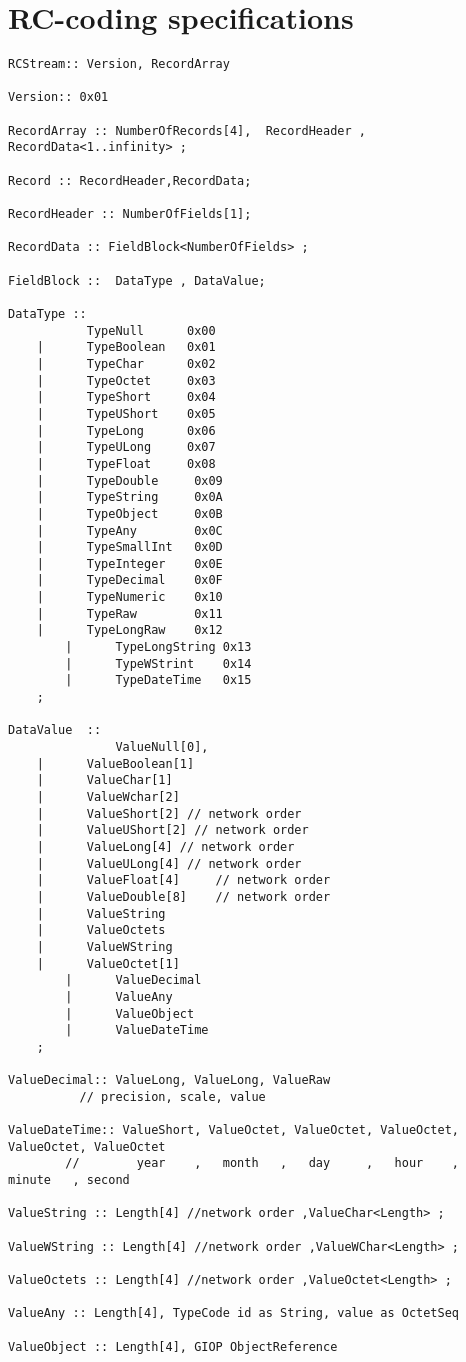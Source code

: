 \documentclass[10pt]{article}
\begin{document}
\section{RC-coding specifications}

\begin{verbatim}
RCStream:: Version, RecordArray

Version:: 0x01

RecordArray :: NumberOfRecords[4],  RecordHeader , RecordData<1..infinity> ;

Record :: RecordHeader,RecordData;

RecordHeader :: NumberOfFields[1];

RecordData :: FieldBlock<NumberOfFields> ;

FieldBlock ::  DataType , DataValue;

DataType ::
 	       TypeNull	     0x00
	|      TypeBoolean   0x01
	|      TypeChar      0x02
	|      TypeOctet     0x03
	|      TypeShort     0x04
	|      TypeUShort    0x05
	|      TypeLong      0x06
	|      TypeULong     0x07
	|      TypeFloat     0x08
	|      TypeDouble     0x09
	|      TypeString     0x0A
	|      TypeObject     0x0B
	|      TypeAny        0x0C
	|      TypeSmallInt   0x0D
	|      TypeInteger    0x0E
	|      TypeDecimal    0x0F
	|      TypeNumeric    0x10
	|      TypeRaw        0x11
	|      TypeLongRaw    0x12
        |      TypeLongString 0x13
        |      TypeWStrint    0x14
        |      TypeDateTime   0x15
    ;	

DataValue  :: 
               ValueNull[0],
	|      ValueBoolean[1] 
	|      ValueChar[1]
	|      ValueWchar[2]
	|      ValueShort[2] // network order
	|      ValueUShort[2] // network order
	|      ValueLong[4] // network order
	|      ValueULong[4] // network order
	|      ValueFloat[4]     // network order
	|      ValueDouble[8]    // network order
	|      ValueString  
	|      ValueOctets    
	|      ValueWString
	|      ValueOctet[1]
        |      ValueDecimal
        |      ValueAny 
        |      ValueObject
        |      ValueDateTime
    ;

ValueDecimal:: ValueLong, ValueLong, ValueRaw
          // precision, scale, value

ValueDateTime:: ValueShort, ValueOctet, ValueOctet, ValueOctet, ValueOctet, ValueOctet
        //        year    ,   month   ,   day     ,   hour    ,  minute   , second

ValueString :: Length[4] //network order ,ValueChar<Length> ;

ValueWString :: Length[4] //network order ,ValueWChar<Length> ;

ValueOctets :: Length[4] //network order ,ValueOctet<Length> ;
 
ValueAny :: Length[4], TypeCode id as String, value as OctetSeq
                
ValueObject :: Length[4], GIOP ObjectReference

\end{verbatim}
\end{document}
